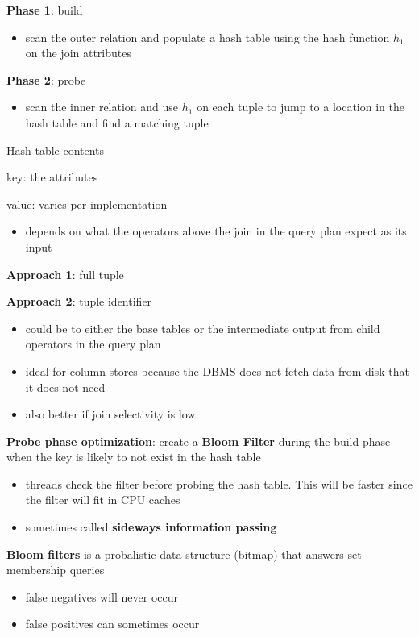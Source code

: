 \documentclass[11pt]{article}
\begin{document}
\textbf{Phase 1}: build
\begin{itemize}
\item scan the outer relation and populate a hash table using the hash function \(h_1\) on the join
attributes
\end{itemize}

\textbf{Phase 2}: probe
\begin{itemize}
\item scan the inner relation and use \(h_1\) on each tuple to jump to a location in the hash table
and find a matching tuple
\end{itemize}

Hash table contents

key: the attributes

value: varies per implementation
\begin{itemize}
\item depends on what the operators above the join in the query plan expect as its input
\end{itemize}

\textbf{Approach 1}: full tuple

\textbf{Approach 2}: tuple identifier
\begin{itemize}
\item could be to either the base tables or the intermediate output from child operators in the
query plan
\item ideal for column stores because the DBMS does not fetch data from disk that it does not need
\item also better if join selectivity is low
\end{itemize}

\textbf{Probe phase optimization}:
create a \textbf{Bloom Filter} during the build phase when the key is likely to not exist in the hash
table
\begin{itemize}
\item threads check the filter before probing the hash table. This will be faster since the filter
will fit in CPU caches
\item sometimes called \textbf{sideways information passing}
\end{itemize}


\textbf{Bloom filters} is a probalistic data structure (bitmap) that answers set membership queries
\begin{itemize}
\item false negatives will never occur
\item false positives can sometimes occur
\end{itemize}
\end{document}
